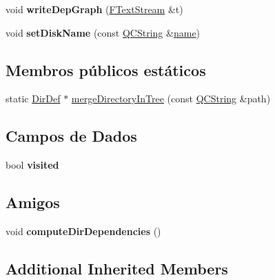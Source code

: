 \begin{DoxyCompactItemize}
\item 
\hypertarget{class_dir_def_a8a4c2ace87655b1d62d28c38d287d244}{void {\bfseries write\-Dep\-Graph} (\hyperlink{class_f_text_stream}{F\-Text\-Stream} \&t)}\label{class_dir_def_a8a4c2ace87655b1d62d28c38d287d244}

\item 
\hypertarget{class_dir_def_a4ca29204a56ab01ca0b1f5e7365d08fc}{void {\bfseries set\-Disk\-Name} (const \hyperlink{class_q_c_string}{Q\-C\-String} \&\hyperlink{class_definition_a2c310e06c9aadc6fb218f80fcbb5c695}{name})}\label{class_dir_def_a4ca29204a56ab01ca0b1f5e7365d08fc}

\end{DoxyCompactItemize}
\subsection*{Membros públicos estáticos}
\begin{DoxyCompactItemize}
\item 
static \hyperlink{class_dir_def}{Dir\-Def} $\ast$ \hyperlink{class_dir_def_ab01ce958d77b8742a94d2f70e09b999d}{merge\-Directory\-In\-Tree} (const \hyperlink{class_q_c_string}{Q\-C\-String} \&path)
\end{DoxyCompactItemize}
\subsection*{Campos de Dados}
\begin{DoxyCompactItemize}
\item 
\hypertarget{class_dir_def_a1df99df902f5f6e81ec3e21e9c07360e}{bool {\bfseries visited}}\label{class_dir_def_a1df99df902f5f6e81ec3e21e9c07360e}

\end{DoxyCompactItemize}
\subsection*{Amigos}
\begin{DoxyCompactItemize}
\item 
\hypertarget{class_dir_def_abf61ee43dee8d980a631843cd26b71cb}{void {\bfseries compute\-Dir\-Dependencies} ()}\label{class_dir_def_abf61ee43dee8d980a631843cd26b71cb}

\end{DoxyCompactItemize}
\subsection*{Additional Inherited Members}


